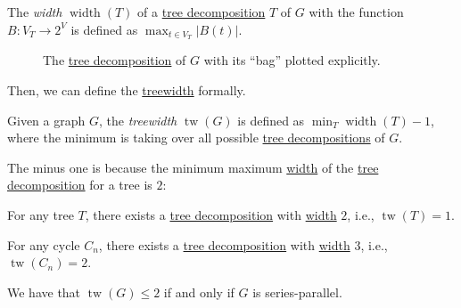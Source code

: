 \begin{definition}[Width]\label{def:tree-decomposition-width}
	The \emph{width} \(\operatorname{width}(T)\) of a \hyperref[def:tree-decomposition]{tree decomposition} \(T\) of \(G\) with the function \(B \colon V_T \to 2^V\) is defined as \(\max _{t \in V_T} \lvert B(t) \rvert \).
\end{definition}

\begin{figure}[H]
	\centering
	\caption{The \hyperref[def:tree-decomposition]{tree decomposition} of \(G\) with its ``bag'' plotted explicitly.}
	\label{fig:tree-decomposition}
\end{figure}

Then, we can define the \hyperref[def:treewidth]{treewidth} formally.

\begin{definition}[Treewidth]\label{def:treewidth}
	Given a graph \(G\), the \emph{treewidth} \(\operatorname{tw}(G) \) is defined as \(\min _{T} \operatorname{width}(T) - 1\), where the minimum is taking over all possible \hyperref[def:tree-decomposition]{tree decompositions} of \(G\).
\end{definition}

The minus one is because the minimum maximum \hyperref[def:tree-decomposition-width]{width} of the \hyperref[def:tree-decomposition]{tree decomposition} for a tree is \(2\):

\begin{eg}[Tree]
	For any tree \(T\), there exists a \hyperref[def:tree-decomposition]{tree decomposition} with \hyperref[def:tree-decomposition-width]{width} \(2\), i.e., \(\operatorname{tw}(T) = 1\).
	\begin{center}
	\end{center}
\end{eg}

\begin{eg}[Cycle]
	For any cycle \(C_n\), there exists a \hyperref[def:tree-decomposition]{tree decomposition} with \hyperref[def:tree-decomposition-width]{width} \(3\), i.e., \(\operatorname{tw}(C_n) = 2\).
	\begin{center}
	\end{center}
\end{eg}

\begin{eg}
	We have that \(\operatorname{tw}(G) \leq 2\) if and only if \(G\) is series-parallel.
\end{eg}

